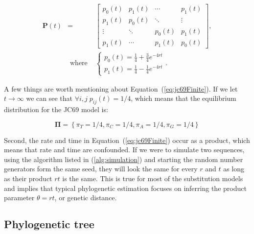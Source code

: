 \begin{eqnarray}
\mathbf{P}\left(t\right) &=& \left[\begin{array}{cccc}
p_{0}(t) & p_{1}(t) & \cdots & p_{1}(t)\\
p_{1}(t) & p_{0}(t) & \ddots & \vdots\\
\vdots & \ddots & p_{0}(t) & p_{1}(t)\\
p_{1}(t) & \cdots & p_{1}(t) & p_{0}(t)
\end{array}\right], \\ \nonumber
&\text{ where }& \ensuremath{\begin{cases}
p_{0}(t)=\frac{1}{4}+\frac{3}{4}e^{-4rt}\\
p_{1}(t)=\frac{1}{4}-\frac{1}{4}e^{-4rt}
\end{cases}}.
\label{eq:jc69Finite}
\end{eqnarray}

\noindent
A few things are worth mentioning about Equation~(\ref{eq:jc69Finite}).
If we let $t\rightarrow \infty$ we can see that $\forall i,j\; p_{ij}(t)=1/4$, which means that the equilibrium distribution for the JC69 model is: 

\begin{equation}
\mathbf{\Pi}=\left\{ \pi_{T}=1/4,\pi_{C}=1/4,\pi_{A}=1/4,\pi_{G}=1/4\right\}
\label{eq:jc69Steady}
\end{equation}

\noindent
Second, the rate and time in Equation~(\ref{eq:jc69Finite}) occur as a product, which means that rate and time are confounded.
If we were to simulate two sequences, using the algorithm listed in (\ref{alg:simulation}) and starting the random number generators form the same seed, they will look the same for every $r$ and $t$ as long as their product $rt$ is the same.
This is true for most of the substitution models and implies that typical phylogenetic estimation focuses on inferring the product parameter $\theta=rt$, or genetic distance.

\subsection{Phylogenetic tree}


